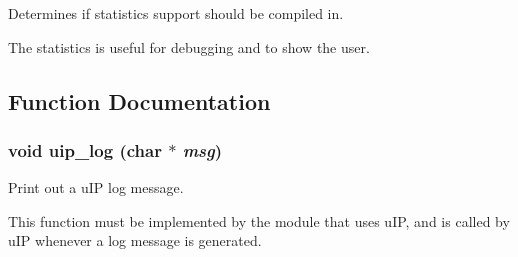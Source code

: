 Determines if statistics support should be compiled in. 

The statistics is useful for debugging and to show the user. 

\subsection{Function Documentation}
\hypertarget{a00076_gb58e1ceb7cb73ca2bcd73146b6c1b4e7}{
\subsubsection[uip\_\-log]{\setlength{\rightskip}{0pt plus 5cm}void uip\_\-log (char $\ast$ {\em msg})}}
\label{a00076_gb58e1ceb7cb73ca2bcd73146b6c1b4e7}


Print out a u\-IP log message. 

This function must be implemented by the module that uses u\-IP, and is called by u\-IP whenever a log message is generated. 